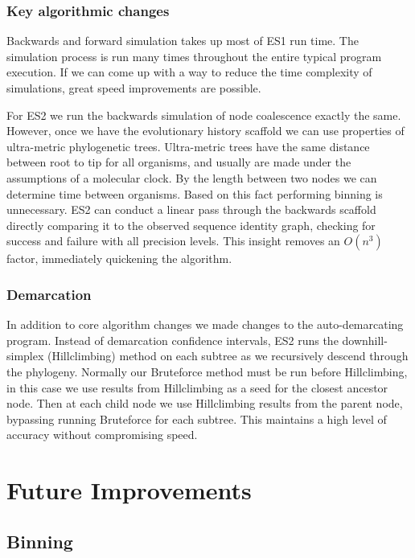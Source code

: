 \subsubsection*{Key algorithmic changes}
Backwards and forward simulation takes up most of ES1 run time.
The simulation process is run many times throughout the entire typical program execution.
If we can come up with a way to reduce the time complexity of simulations, great speed improvements are possible.

For ES2 we run the backwards simulation of node coalescence exactly the same.
However, once we have the evolutionary history scaffold we can use properties of ultra-metric phylogenetic trees.
Ultra-metric trees have the same distance between root to tip for all organisms, and usually are made under the assumptions of a molecular clock.
By the length between two nodes we can determine time between organisms.
Based on this fact performing binning is unnecessary.
ES2 can conduct a linear pass through the backwards scaffold directly comparing it to the observed sequence identity graph, checking for success and failure with all precision levels.
This insight removes an $O(n^3)$ factor, immediately quickening the algorithm.

\subsubsection*{Demarcation}
In addition to core algorithm changes we made changes to the auto-demarcating program.
Instead of demarcation confidence intervals, ES2 runs the downhill-simplex (Hillclimbing) method on each subtree as we recursively descend through the phylogeny.
Normally our Bruteforce method must be run before Hillclimbing, in this case we use results from Hillclimbing as a seed for the closest ancestor node.
Then at each child node we use Hillclimbing results from the parent node, bypassing running Bruteforce for each subtree.
This maintains a high level of accuracy without compromising speed.

\section{Future Improvements}
\subsection*{Binning}
